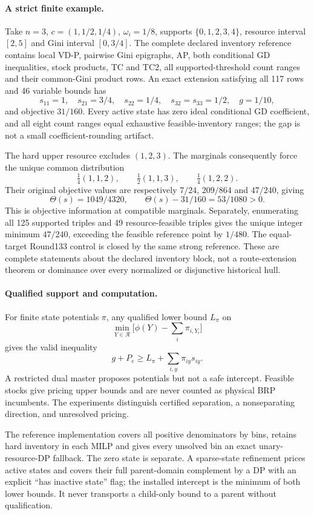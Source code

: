 \paragraph{A strict finite example.}
Take $n=3$, $c=(1,1/2,1/4)$, $\omega_i=1/8$, supports
$\{0,1,2,3,4\}$, resource interval $[2,5]$ and Gini interval $[0,3/4]$.
The complete declared inventory reference contains local VD-P, pairwise Gini
epigraphs, AP, both conditional GD inequalities, stock products, TC and TC2,
all supported-threshold count ranges and their common-Gini product rows.
An exact extension satisfying all 117 rows and 46 variable bounds has
\[
 s_{11}=1,\quad s_{21}=3/4,\quad s_{22}=1/4,\quad
 s_{32}=s_{33}=1/2,\quad g=1/10,
\]
and objective $31/160$. Every active state has zero ideal conditional GD
coefficient, and all eight count ranges equal exhaustive feasible-inventory
ranges; the gap is not a small coefficient-rounding artifact.

The hard upper resource excludes $(1,2,3)$. The marginals consequently force
the unique common distribution
\[
 \tfrac14(1,1,2),\qquad\tfrac12(1,1,3),\qquad\tfrac14(1,2,2).
\]
Their original objective values are respectively $7/24$, $209/864$ and
$47/240$, giving
\[
 \Theta(s)=1049/4320,\qquad
 \Theta(s)-31/160=53/1080>0.
\]
This is objective information at compatible marginals. Separately,
enumerating all 125 supported triples and 49 resource-feasible triples gives
the unique integer minimum $47/240$, exceeding the feasible reference point
by $1/480$. The equal-target Round133 control is closed by the same strong
reference. These are complete statements about the declared inventory block,
not a route-extension theorem or dominance over every normalized or
disjunctive historical hull.

\paragraph{Qualified support and computation.}
For finite state potentials $\pi$, any qualified lower bound $L_\pi$ on
\[
 \min_{Y\in\mathcal R}\bigl[\phi(Y)-\sum_i\pi_{i,Y_i}\bigr]
\]
gives the valid inequality
\[
 g+P_e\ge L_\pi+\sum_{i,y}\pi_{iy}s_{iy}.
\]
A restricted dual master proposes potentials but not a safe intercept.
Feasible stocks give pricing upper bounds and are never counted as physical
BRP incumbents. The experiments distinguish certified separation, a
nonseparating direction, and unresolved pricing.

The reference implementation covers all positive denominators by bins,
retains hard inventory in each MILP and gives every unsolved bin an exact
unary-resource-DP fallback. The zero state is separate. A sparse-state
refinement prices active states and covers their full parent-domain
complement by a DP with an explicit ``has inactive state'' flag; the
installed intercept is the minimum of both lower bounds. It never transports
a child-only bound to a parent without qualification.

